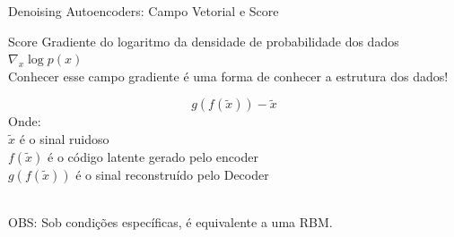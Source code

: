 \documentclass[aspectratio=169,xcolor=dvipsnames]{beamer}
\begin{document}
\begin{frame}{Denoising Autoencoders: Campo Vetorial e Score}
    \begin{block}{Score}
        Gradiente do logaritmo da densidade de probabilidade dos dados
        \vspace{5}
        \centering
        \\$\nabla_x \log p(x)$
        \vspace{5}
        \\Conhecer esse campo gradiente é uma forma de conhecer a estrutura dos dados!
    \end{block}    
    \begin{equation}
        g(f(\tilde{x})) - \tilde{x}
    \end{equation}
    Onde:
    \\$\tilde{x}$ é o sinal ruidoso
    \\$f(\tilde{x})$ é o código latente gerado pelo encoder
    \\$g(f(\tilde{x}))$ é o sinal reconstruído pelo Decoder
    \vspace{5}
    
    \\ OBS: Sob condições específicas, é equivalente a uma RBM.
    
\end{frame}
\end{document}
